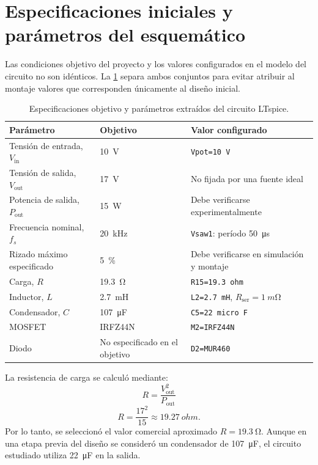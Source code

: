 \documentclass[12pt]{article}
\begin{document}
\section{Especificaciones iniciales y parámetros del esquemático}
Las condiciones objetivo del proyecto y los valores configurados en el modelo del circuito no son idénticos. La \cref{tab:especificaciones} separa ambos conjuntos para evitar atribuir al montaje valores que corresponden únicamente al diseño inicial.
\begin{table}[H]
\centering
\caption{Especificaciones objetivo y parámetros extraídos del circuito LTspice.}
\label{tab:especificaciones}
\begin{tabular}{p{5.3cm}p{3.1cm}p{4.4cm}}
\toprule
\textbf{Parámetro} & \textbf{Objetivo} & \textbf{Valor configurado}\\
\midrule
Tensión de entrada, $V_{\mathrm{in}}$ & \SI{10}{V} & \texttt{Vpot=10 V}\\
Tensión de salida, $V_{\mathrm{out}}$ & \SI{17}{V} & No fijada por una fuente ideal\\
Potencia de salida, $P_{\mathrm{out}}$ & \SI{15}{W} & Debe verificarse experimentalmente\\
Frecuencia nominal, $f_s$ & \SI{20}{kHz} & \texttt{Vsaw1}: período \SI{50}{\micro s}\\
Rizado máximo especificado & \SI{5}{\percent} & Debe verificarse en simulación y montaje\\
Carga, $R$ & \SI{19.3}{\ohm} & \texttt{R15=19.3 ohm}\\
Inductor, $L$ & \SI{2.7}{mH} & \texttt{L2=2.7 mH}, $R_{\mathrm{ser}}=\SI{1}{m\ohm}$\\
Condensador, $C$ & \SI{107}{\micro F} & \texttt{C5=22 micro F}\\
MOSFET & IRFZ44N & \texttt{M2=IRFZ44N}\\
Diodo & No especificado en el objetivo & \texttt{D2=MUR460}\\
\bottomrule
\end{tabular}
\end{table}

La resistencia de carga se calculó mediante:
\begin{equation}
R=\frac{V_{\mathrm{out}}^2}{P_{\mathrm{out}}}
\label{eq:carga}
\end{equation}
\[
R=\frac{17^2}{15}\approx\SI{19.27}{ohm}.
\]
Por lo tanto, se seleccionó el valor comercial aproximado $R=\SI{19.3}{\ohm}$. Aunque en una etapa previa del diseño se consideró un condensador de \SI{107}{\micro F}, el circuito estudiado utiliza \SI{22}{\micro F} en la salida.
\end{document}
